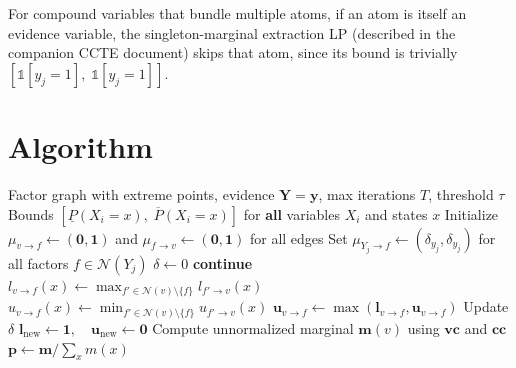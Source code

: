 \documentclass[11pt]{article}
\begin{document}
For compound variables that bundle multiple atoms, if an atom is itself an
evidence variable, the singleton-marginal extraction LP (described in the
companion CCTE document) skips that atom, since its bound is trivially
$[\mathbb{1}[y_j{=}1],\; \mathbb{1}[y_j{=}1]]$.

\section{Algorithm}

\begin{algorithm}[H]
\caption{Interval Belief Propagation (IBP)}
\label{alg:ibp}
\begin{algorithmic}[1]
\Require Factor graph with extreme points, evidence $\mathbf{Y} = \mathbf{y}$,
         max iterations $T$, threshold $\tau$
\Ensure Bounds $[\underline{P}(X_i{=}x),\; \overline{P}(X_i{=}x)]$ for \textbf{all}
        variables $X_i$ and states $x$
\Statex
\State Initialize $\mu_{v \to f} \gets (\mathbf{0}, \mathbf{1})$ and
       $\mu_{f \to v} \gets (\mathbf{0}, \mathbf{1})$ for all edges
\Statex
{}
  \State Set $\mu_{Y_j \to f} \gets (\delta_{y_j}, \delta_{y_j})$ for all factors
         $f \in \mathcal{N}(Y_j)$
\EndFor
\Statex
{}
  \State $\delta \gets 0$
  \Statex
     \textbf{continue}
    \EndIf
      \State $l_{v \to f}(x) \gets \max_{f' \in \mathcal{N}(v) \setminus \{f\}}
             l_{f' \to v}(x)$
      \State $u_{v \to f}(x) \gets \min_{f' \in \mathcal{N}(v) \setminus \{f\}}
             u_{f' \to v}(x)$
    \EndFor
    \State $\mathbf{u}_{v \to f} \gets \max(\mathbf{l}_{v \to f}, \mathbf{u}_{v \to f})$
    \State Update $\delta$
  \EndFor
  \Statex
    \State $\mathbf{l}_{\mathrm{new}} \gets \mathbf{1}, \quad \mathbf{u}_{\mathrm{new}} \gets \mathbf{0}$
        \State Compute unnormalized marginal $\mathbf{m}(v)$ using $\mathbf{vc}$ and $\mathbf{cc}$
        \State $\mathbf{p} \gets \mathbf{m} / \sum_{x} m(x)$

\end{algorithmic}
\end{algorithm}
\end{document}
